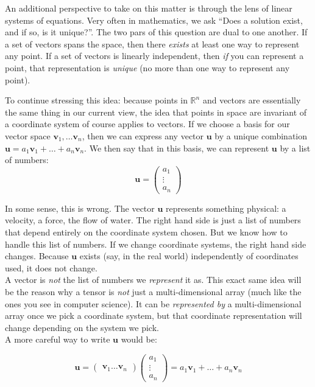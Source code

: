 	An additional perspective to take on this matter is through the lens of linear systems of equations.  Very often in mathematics, we ask ``Does a solution exist, and if so, is it unique?''. The two pars of this question are dual to one another. If a set of vectors spans the space, then there \emph{exists} at least one way to represent any point. If a set of vectors is linearly independent, then \emph{if} you can represent a point, that representation is \emph{unique} (no more than one way to represent any point).
	
	To continue stressing this idea: because points in $\mathbb R^n$ and vectors are essentially the same thing in our current view, the idea that points in space are invariant of a coordinate system of course applies to vectors. If we choose a basis for our vector space $\mathbf v_1, \dots \mathbf v_n$, then we can express any vector $\mathbf u$ by a unique combination $\mathbf u = a_1 \mathbf v_1 + \dots + a_n \mathbf v_n$. We then say that in this basis, we can represent $\mathbf u$ by a list of numbers:
	\begin{equation*}
		\mathbf u = \begin{pmatrix} a_1 \\ \vdots \\a_n	\end{pmatrix}
	\end{equation*}
	
	In some sense, this is wrong. The vector $\mathbf u$ represents something physical: a velocity, a force, the flow of water. The right hand side is just a list of numbers that depend entirely on the coordinate system chosen.  But we know how to handle this list of numbers.  If we change coordinate systems, the right hand side changes. Because $\mathbf u$ exists (say, in the real world) independently of coordinates used, it does not change.\\
	
	A vector is \emph{not} the list of numbers we \textit{represent} it as.  This exact same idea will be the reason why a tensor is \emph{not} just a multi-dimensional array (much like the ones you see in computer science). It can be \emph{represented by} a multi-dimensional array once we pick a coordinate system, but that coordinate representation will change depending on the system we pick. \\
	
	A more careful way to write $\mathbf u$ would be:
	
	\begin{equation*}
		\mathbf u = \begin{pmatrix}
			\mathbf v_1  \dots \mathbf v_n
		\end{pmatrix}\begin{pmatrix} a_1 \\ \vdots \\a_n	\end{pmatrix} = a_1 \mathbf v_1 + \dots + a_n \mathbf v_n
	\end{equation*}
	
